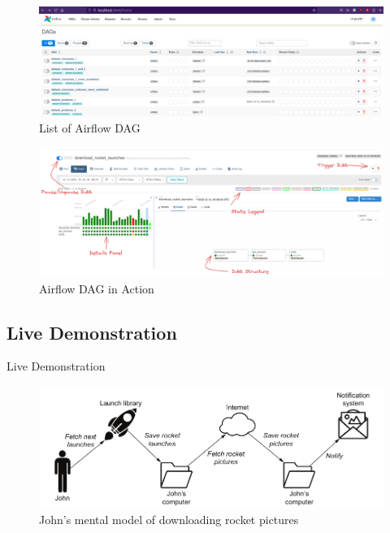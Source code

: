 \documentclass[14pt, aspectratio=169]{beamer}
\begin{document}
	\begin{frame}
		\begin{figure}
			\centering
			\includegraphics[width=15cm]{list-of-dags.png}
			\caption{List of Airflow DAG}
		\end{figure}
	\end{frame}

	\begin{frame}
		\begin{figure}
			\centering
			\includegraphics[width=15cm]{airflow-mapped.png}
			\caption{Airflow DAG in Action}
		\end{figure}
	\end{frame}

	\subsection{Live Demonstration}
	\begin{frame}{Live Demonstration}
		\begin{figure}[H]
			\centering
			\includegraphics[width=12cm]{mental_model.png}
			\caption{John’s mental model of downloading rocket pictures}
		\end{figure}
	\end{frame}
\end{document}
